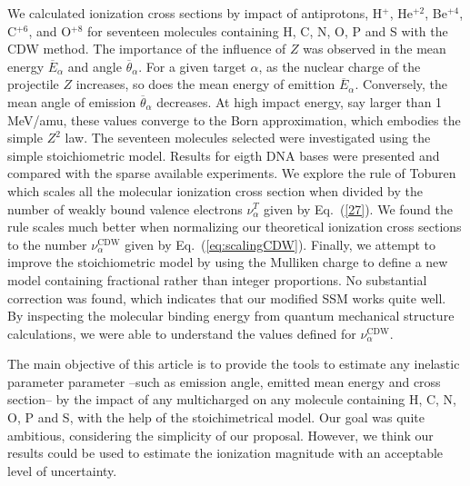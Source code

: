 \documentclass[preprint,12pt]{article}
\begin{document}
We calculated ionization cross sections by impact of antiprotons, 
H$^{+}$, He$^{+2}$, Be$^{+4}$, C$^{+6}$, and O$^{+8}$ for seventeen 
molecules containing H, C, N, O, P and S with the CDW method. The 
importance of the influence of $Z$ was observed in the mean energy 
$\overline{E}_{\alpha}$ and angle $\overline{\theta}_{\alpha}$. 
For a given target $\alpha$, as the nuclear charge of the projectile 
$Z$ increases, so does the mean energy of emittion $\overline{E}_{\alpha}$. 
Conversely, the mean angle of emission  $\overline{\theta}_{\alpha}$ 
decreases. At high impact energy, say larger than 1 MeV/amu, these 
values converge to the Born approximation, which embodies the simple 
$Z^{2}$ law. The seventeen molecules selected were investigated using 
the simple stoichiometric model. Results for eigth DNA bases were 
presented and compared with the sparse available experiments. We explore 
the rule of Toburen which scales all the molecular ionization cross 
section when divided by the number of weakly bound valence electrons 
$\nu_{\alpha}^T$ given by Eq.~(\ref{27}). 
We found the rule scales much better when normalizing our theoretical 
ionization cross sections to the number $\nu_{\alpha}^{\text{CDW}}$ 
given by Eq.~(\ref{eq:scalingCDW}). Finally, we attempt to improve the 
stoichiometric model by using the Mulliken charge to define a new model 
containing fractional rather than integer proportions. No substantial 
correction was found, which indicates that our modified SSM works quite 
well. By inspecting the molecular binding energy from quantum mechanical 
structure calculations, we were able to understand the values defined
for $\nu_{\alpha}^{\text{CDW}}$.

The main objective of this article is to provide the tools to estimate 
any inelastic parameter parameter --such as emission angle, emitted mean 
energy and cross section-- by the impact of any multicharged on any 
molecule containing H, C, N, O, P and S, with the help of the 
stoichimetrical model. Our goal was quite ambitious, considering the 
simplicity of our proposal. However, we think our results could be used 
to estimate the ionization magnitude with an acceptable level of 
uncertainty.

\bigskip
\end{document}
